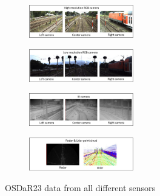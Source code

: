 \begin{figure}[H]
    \centering
    \begin{subfigure}{\textwidth}
        \centering
        \includegraphics[width=0.5\textwidth]{PICs/OSDaR23_dataset/camerasetup_high_res_cameras.png}
    \end{subfigure}

    \begin{subfigure}{\textwidth}
        \centering
        \includegraphics[width=0.5\textwidth]{PICs/OSDaR23_dataset/camerasetup_low_res_cameras.png}
    \end{subfigure}

    \begin{subfigure}{\textwidth}
        \centering
        \includegraphics[width=0.5\textwidth]{PICs/OSDaR23_dataset/camerasetup_IR.png}
    \end{subfigure}

    \begin{subfigure}{\textwidth}
        \centering
        \includegraphics[width=0.5\textwidth]{PICs/OSDaR23_dataset/camerasetup_Lidar_Radar.png}
    \end{subfigure}
    
    \caption{OSDaR23 data from all different sensors \cite{oSDaR23}}
    \label{fig:OSDaR23_captured_data}
\end{figure}


